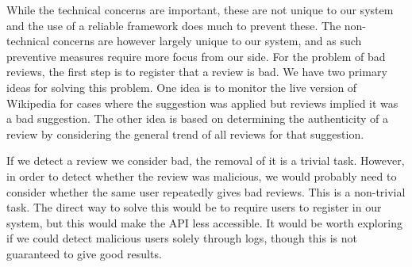 While the technical concerns are important, these are not unique to our system and the use of a reliable framework does much to prevent these. The non-technical concerns are however largely unique to our system, and as such preventive measures require more focus from our side. For the problem of bad reviews, the first step is to register that a review is bad. We have two primary ideas for solving this problem. One idea is to monitor the live version of Wikipedia for cases where the suggestion was applied but reviews implied it was a bad suggestion. The other idea is based on determining the authenticity of a review by considering the general trend of all reviews for that suggestion.

If we detect a review we consider bad, the removal of it is a trivial task. However, in order to detect whether the review was malicious, we would probably need to consider whether the same user repeatedly gives bad reviews. This is a non-trivial task. The direct way to solve this would be to require users to register in our system, but this would make the API less accessible. It would be worth exploring if we could detect malicious users solely through logs, though this is not guaranteed to give good results.
